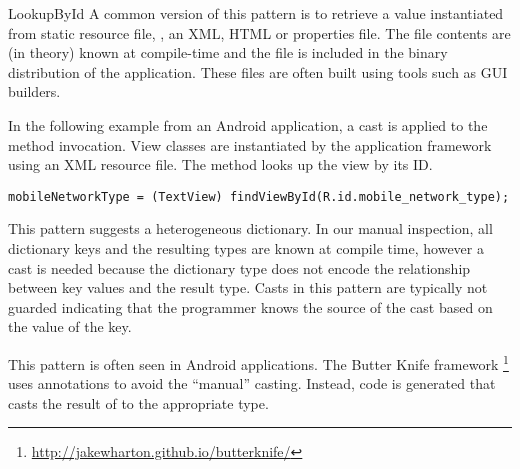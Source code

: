 \begin{pattern}{LookupById}
A common version of this pattern is to retrieve a value instantiated from
static resource file, \eg, an XML, HTML or \java{} properties file.
The file contents are (in theory) known at compile-time and the file is included in the binary distribution of the application.
These files are often built using tools such as GUI builders.

In the following example from an Android application,%
\def\urlvar{http://bit.ly/pwittchen_NetworkEvents_2HGbrMq}
a cast is applied to the  method invocation.
View classes are instantiated by the application framework using an XML resource file.
The  method looks up the view by its ID.

\begin{verbatim}
mobileNetworkType = (TextView) findViewById(R.id.mobile_network_type);
\end{verbatim}

\discussion{}
This pattern suggests a heterogeneous dictionary.
In our manual inspection,
all dictionary keys and the resulting types are known at
compile time, however
a cast is needed because the dictionary type does not encode the
relationship between key values and the result type.
Casts in this pattern are typically not guarded indicating that the programmer
knows the source of the cast based on the value of the key.

This pattern is often seen in Android applications.
The Butter Knife framework%
\footnote{\url{http://jakewharton.github.io/butterknife/}}
uses annotations to avoid the ``manual'' casting.
Instead, code is generated that casts the result of  to the
appropriate type.









\end{pattern}

